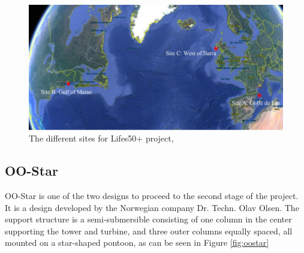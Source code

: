 \begin{figure}[H]
\centering
\includegraphics[scale=0.6]{figures/sites}
\caption[$\; \:$Sites for Lifes50+ project]{The different sites for Lifes50+ project, \cite{Lifes50+D1.6} }
 \label{fig:sites}
\end{figure}

\subsection{OO-Star}
OO-Star is one of the two designs to proceed to the second stage of the project. It is a design developed by the Norwegian company Dr. Techn. Olav Olsen.\newline
\newline
The support structure is a semi-submersible consisting of one column in the center supporting the tower and turbine, and three outer columns equally spaced, all mounted on a star-shaped pontoon, as can be seen in Figure \ref{fig:oostar}

